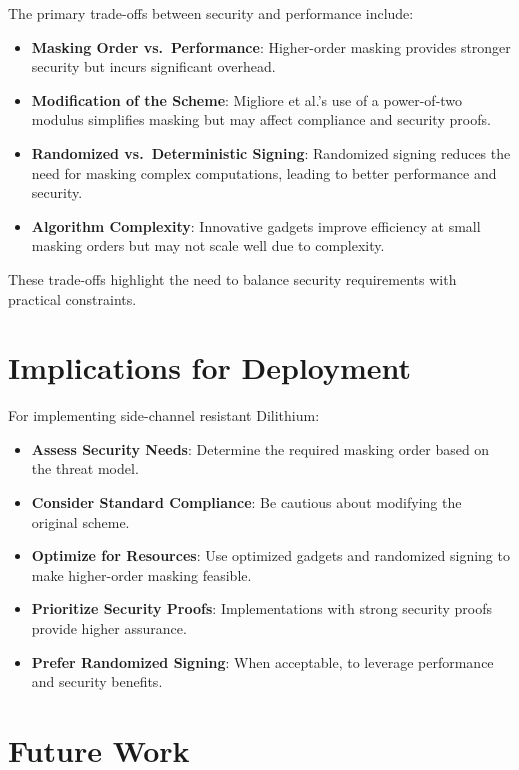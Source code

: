 The primary trade-offs between security and performance include:

\begin{itemize}
    \item \textbf{Masking Order vs.\ Performance}: Higher-order masking provides stronger security but incurs significant overhead.
    \item \textbf{Modification of the Scheme}: Migliore et al.'s use of a power-of-two modulus simplifies masking but may affect compliance and security proofs.
    \item \textbf{Randomized vs.\ Deterministic Signing}: Randomized signing reduces the need for masking complex computations, leading to better performance and security.
    \item \textbf{Algorithm Complexity}: Innovative gadgets improve efficiency at small masking orders but may not scale well due to complexity.
\end{itemize}

These trade-offs highlight the need to balance security requirements with practical constraints.

\section{Implications for Deployment}

For implementing side-channel resistant Dilithium:

\begin{itemize}
    \item \textbf{Assess Security Needs}: Determine the required masking order based on the threat model.
    \item \textbf{Consider Standard Compliance}: Be cautious about modifying the original scheme.
    \item \textbf{Optimize for Resources}: Use optimized gadgets and randomized signing to make higher-order masking feasible.
    \item \textbf{Prioritize Security Proofs}: Implementations with strong security proofs provide higher assurance.
    \item \textbf{Prefer Randomized Signing}: When acceptable, to leverage performance and security benefits.
\end{itemize}

\section{Future Work}

